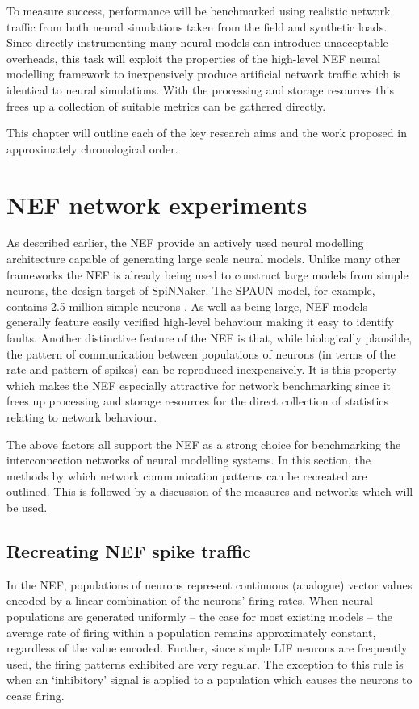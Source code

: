 	To measure success, performance will be benchmarked using realistic network
	traffic from both neural simulations taken from the field and synthetic loads.
	Since directly instrumenting many neural models can introduce unacceptable
	overheads, this task will exploit the properties of the high-level NEF neural
	modelling framework to inexpensively produce artificial network traffic which
	is identical to neural simulations. With the processing and storage resources
	this frees up a collection of suitable metrics can be gathered directly.
	
	This chapter will outline each of the key research aims and the work proposed
	in approximately chronological order.
	
	\section{NEF network experiments}
		
		As described earlier, the NEF provide an actively used neural modelling
		architecture capable of generating large scale neural models. Unlike many
		other frameworks the NEF is already being used to construct large models
		from simple neurons, the design target of SpiNNaker. The SPAUN model, for
		example, contains 2.5 million simple neurons \cite{eliasmith12}. As well as
		being large, NEF models generally feature easily verified high-level
		behaviour making it easy to identify faults. Another distinctive feature of
		the NEF is that, while biologically plausible, the pattern of communication
		between populations of neurons (in terms of the rate and pattern of spikes)
		can be reproduced inexpensively. It is this property which makes the NEF
		especially attractive for network benchmarking since it frees up processing
		and storage resources for the direct collection of statistics relating to
		network behaviour.
		
		The above factors all support the NEF as a strong choice for benchmarking
		the interconnection networks of neural modelling systems. In this section,
		the methods by which network communication patterns can be recreated are
		outlined. This is followed by a discussion of the measures and networks
		which will be used.
		
		\subsection{Recreating NEF spike traffic}
			
			In the NEF, populations of neurons represent continuous (analogue) vector
			values encoded by a linear combination of the neurons' firing rates. When
			neural populations are generated uniformly -- the case for most existing
			models -- the average rate of firing within a population remains
			approximately constant, regardless of the value encoded. Further, since
			simple LIF neurons are frequently used, the firing patterns exhibited are
			very regular. The exception to this rule is when an `inhibitory' signal is
			applied to a population which causes the neurons to cease firing.
			
